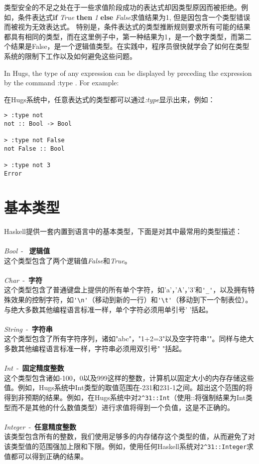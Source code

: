类型安全的不足之处在于一些求值阶段成功的表达式却因类型原因而被拒绝。例如，条件表达式\textbf{if} \textit{True} \textbf{then} \textit{1} \textbf{else}
\textit{False}求值结果为1, 但是因包含一个类型错误而被视为无效表达式。
特别是，条件表达式的类型推断规则要求所有可能的结果都具有相同的类型，而在这里例子中，第一种结果为1，是一个数字类型，而第二个结果是False，是一个逻辑值类型。在实践中，程序员很快就学会了如何在类型系统的限制下工作以及如何避免这些问题。

In Hugs, the type of any expression can be displayed by preceding the expression by the command :type . For example:

在Hugs系统中，任意表达式的类型都可以通过\textit{:type}显示出来，例如：

\begin{verbatim}
> :type not
not :: Bool -> Bool

> :type not False
not False :: Bool

> :type not 3
Error
\end{verbatim}

\section{基本类型}
\noindent Haskell提供一套内置到语言中的基本类型，下面是对其中最常用的类型描述：
\\
\\
\textit{Bool}~-~ \textbf{逻辑值}\\
这个类型包含了两个逻辑值\textit{False}和\textit{True}。
\\
\\
\textit{Char}~-~\textbf{字符}\\
这个类型包含了普通键盘上提供的所有单个字符，如'a'，'A'，'3'和\verb|'_'|，以及拥有特殊效果的控制字符，如\verb|'\n'|（移动到新的一行）和\verb|'\t'|（移动到下一个制表位）。与绝大多数其他编程语言标准一样，单个字符必须用单引号'
'括起。
\\
\\
\textit{String}~-~\textbf{字符串}\\
这个类型包含了所有字符序列，诸如"abc"，"1+2=3"以及空字符串""。同样与绝大多数其他编程语言标准一样，字符串必须用双引号"
"括起。
\\
\\
\textit{Int}~-~\textbf{固定精度整数}\\
这个类型包含诸如-100，0以及999这样的整数，计算机以固定大小的内存存储这些值。例如，Hugs系统中Int类型的取值范围在-231和231-1之间。超出这个范围的将得到非预期的结果。例如，在Hugs系统中对\verb|2^31::Int|（使用::将强制结果为Int类型而不是其他的什么数值类型）进行求值将得到一个负值，这是不正确的。
\\
\\
\textit{Integer}~-~\textbf{任意精度整数}\\
该类型包含所有的整数，我们使用足够多的内存储存这个类型的值，从而避免了对该类型值的范围强加上限和下限。例如，使用任何Haskell系统对\verb|2^31::Integer|求值都可以得到正确的结果。

